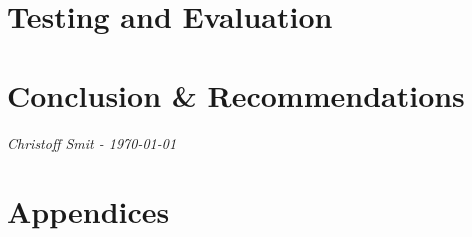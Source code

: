 \documentclass[a4paper,12pt]{article}
\numberwithin{equation}{section}
\numberwithin{figure}{section}
\numberwithin{table}{section}
\begin{document}
\newpage
\section{Testing and Evaluation}







\newpage
\section{Conclusion \& Recommendations}


\textit{Christoff Smit - \today}




\clearpage
\newpage
{}
\printbibliography



\clearpage
\newpage
\section*{Appendices}
% 
\end{document}
